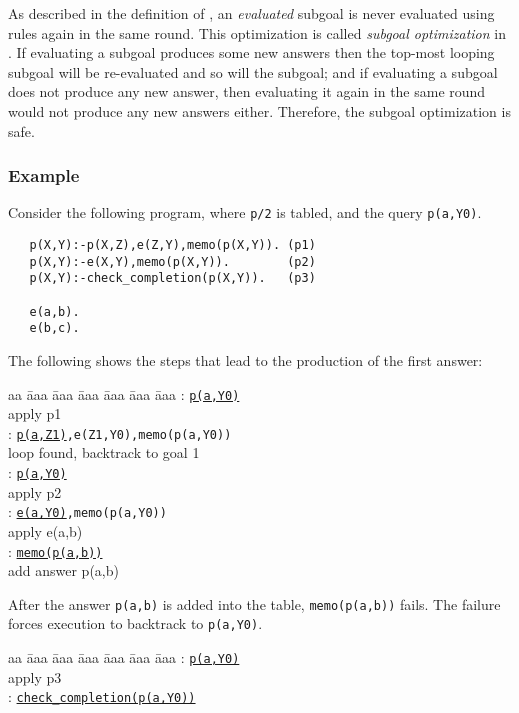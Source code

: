 \documentclass{tlp}
\begin{document}
As described in the definition of , an {\it evaluated} subgoal is never evaluated using rules again in the same round. This optimization is called {\it subgoal optimization} in \cite{Zhou03}. If evaluating a  subgoal produces some new answers then the top-most looping subgoal will be re-evaluated and so will the subgoal; and if evaluating a subgoal does not produce any new answer, then evaluating it again in the same round would not produce any new answers either. Therefore, the subgoal optimization is safe.

\subsubsection{Example}
Consider the following program, where {\tt p/2} is tabled, and the query {\tt p(a,Y0)}.
\begin{verbatim}
   p(X,Y):-p(X,Z),e(Z,Y),memo(p(X,Y)). (p1)
   p(X,Y):-e(X,Y),memo(p(X,Y)).        (p2)       
   p(X,Y):-check_completion(p(X,Y)).   (p3)

   e(a,b).                             
   e(b,c).                             
\end{verbatim}
The following shows the steps that lead to the production of the first answer:
\begin{tabbing}
aa \= aaa \= aaa \= aaa \= aaa \= aaa \= aaa \kill
\> : {\tt \underline{p(a,Y0)}} \\
\> \> \> {\scriptsize apply p1} \\
\> : {\tt \underline{p(a,Z1)},e(Z1,Y0),memo(p(a,Y0))} \\
\> \> \> {\scriptsize loop found, backtrack to goal 1} \\
\> : {\tt \underline{p(a,Y0)}} \\
\> \> \>  {\scriptsize apply p2} \\
\> : {\tt \underline{e(a,Y0)},memo(p(a,Y0))} \\
\> \> \>  {\scriptsize apply e(a,b)} \\
\> : {\tt \underline{memo(p(a,b))}} \\
\> \> \>  {\scriptsize add answer p(a,b)} 
\end{tabbing}      
After the answer {\tt p(a,b)} is added into the table, {\tt memo(p(a,b))} fails. The failure forces execution to backtrack to {\tt p(a,Y0)}.
\begin{tabbing}
aa \= aaa \= aaa \= aaa \= aaa \= aaa \= aaa \kill
\> : {\tt \underline{p(a,Y0)}} \\
\> \> \>  {\scriptsize apply p3} \\
\> : {\tt \underline{check\_completion(p(a,Y0))}} 
\end{tabbing}      
\end{document}
